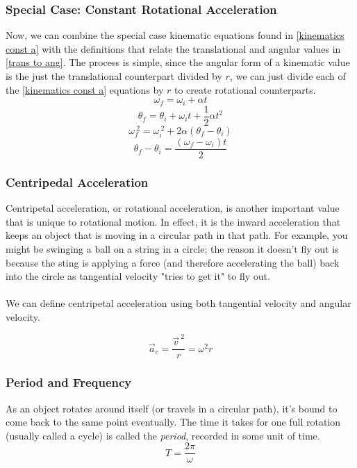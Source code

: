 \documentclass{article}
\begin{document}
\subsubsection{Special Case: Constant Rotational Acceleration}
Now, we can combine the special case kinematic equations found in \ref{kinematics const a} with the definitions that relate the translational and angular values in \ref{trans to ang}. The process is simple, since the angular form of a kinematic value is the just the translational counterpart divided by $r$, we can just divide each of the \ref{kinematics const a} equations by $r$ to create rotational counterparts.
\begin{equation}
    \omega_f = \omega_i + \alpha t
\end{equation}
\begin{equation}
    \theta_f = \theta_i + \omega_it+ \frac{1}{2}\alpha t^2 
\end{equation}
\begin{equation}
    \omega_f^{ \: 2} = \omega_i^{ \: 2} + 2 \alpha  (\theta_f - \theta_i)
\end{equation}
\begin{equation}
    \theta_f - \theta_i = \frac{(\omega_f - \omega_i)t}{2}
\end{equation}

\subsubsection{Centripedal Acceleration}
Centripetal acceleration, or rotational acceleration, is another important value that is unique to rotational motion. In effect, it is the inward acceleration that keeps an object that is moving in a circular path in that path. For example, you might be swinging a ball on a string in a circle; the reason it doesn't fly out is because the sting is applying a force (and therefore accelerating the ball) back into the circle as tangential velocity "tries to get it" to fly out. \\ \\
We can define centripetal acceleration using both tangential velocity and angular velocity.

\begin{equation}
    \vec{a}_c = \frac{\vec{v}^{\: 2}}{r} = \omega^2 r
\end{equation}

\subsubsection{Period and Frequency}
As an object rotates around itself (or travels in a circular path), it's bound to come back to the same point eventually. The time it takes for one full rotation (usually called a cycle) is called the \textit{period}, recorded in some unit of time.
\begin{equation}
    T = \frac{2 \pi}{\omega}
\end{equation}
\end{document}
